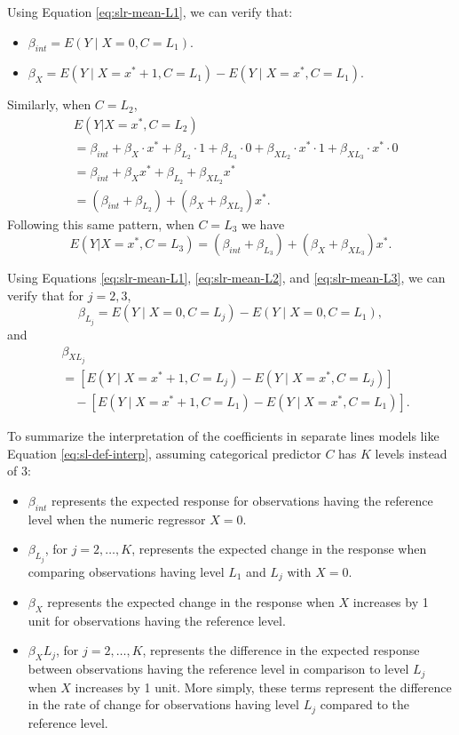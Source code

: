 \documentclass[
]{book}
\providecommand{\tightlist}{%
  \setlength{\itemsep}{0pt}\setlength{\parskip}{0pt}}
\theoremstyle{definition}
\theoremstyle{definition}
\theoremstyle{definition}
\theoremstyle{definition}
\theoremstyle{remark}
\begin{document}
Using Equation \eqref{eq:slr-mean-L1}, we can verify that:

\begin{itemize}
\tightlist
\item
  \(\beta_{int} = E(Y\mid X = 0, C=L_1)\).
\item
  \(\beta_{X} = E(Y\mid X = x^* + 1, C=L_1) - E(Y\mid X = x^*, C=L_1)\).
\end{itemize}

Similarly, when \(C=L_2\), \[
\begin{aligned}
& E(Y|X = x^*, C=L_2) \\
&= \beta_{int} + \beta_X \cdot x^* + \beta_{L_2} \cdot 1 + \beta_{L_3} \cdot 0  + \beta_{X L_2} \cdot x^* \cdot 1 + \beta_{X L_3}\cdot x^* \cdot 0 \\
&= \beta_{int} + \beta_X x^* + \beta_{L_2} + \beta_{XL_2}x^*\\
&= (\beta_{int} + \beta_{L_2}) + (\beta_X + \beta_{XL_2})x^*.
\end{aligned}
\label{eq:slr-mean-L2}
\] Following this same pattern, when \(C=L_3\) we have \[
E(Y|X = x^*, C=L_3) = (\beta_{int} + \beta_{L_3}) + (\beta_X + \beta_{XL_3})x^*. \label{eq:slr-mean-L3}
\]

Using Equations \eqref{eq:slr-mean-L1}, \eqref{eq:slr-mean-L2}, and
\eqref{eq:slr-mean-L3}, we can verify that for \(j=2,3\),
\[\beta_{L_j}= E(Y\mid X = 0, C=L_j) - E(Y\mid X = 0, C=L_1),\] and \[
\begin{aligned}
& \beta_{XL_j} \\
&= [E(Y\mid X = x^*+1, C=L_j) - E(Y\mid X = x^*, C=L_j)]\\
&\quad-[E(Y\mid X = x^*+1, C=L_1) - E(Y\mid X = x^*, C=L_1)].
\end{aligned}
\]

To summarize the interpretation of the coefficients in separate lines
models like Equation \eqref{eq:sl-def-interp}, assuming categorical
predictor \(C\) has \(K\) levels instead of 3:

\begin{itemize}
\tightlist
\item
  \(\beta_{int}\) represents the expected response for observations
  having the reference level when the numeric regressor \(X = 0\).
\item
  \(\beta_{L_j}\), for \(j=2,\ldots,K\), represents the expected change in
  the response when comparing observations having level \(L_1\) and
  \(L_j\) with \(X=0\).
\item
  \(\beta_X\) represents the expected change in the response when \(X\)
  increases by 1 unit for observations having the reference level.
\item
  \(\beta_X L_j\), for \(j=2,\ldots,K\), represents the difference in the
  expected response between observations having the reference level in
  comparison to level \(L_j\) when \(X\) increases by 1 unit. More simply,
  these terms represent the difference in the rate of change for
  observations having level \(L_j\) compared to the reference level.
\end{itemize}
\end{document}
